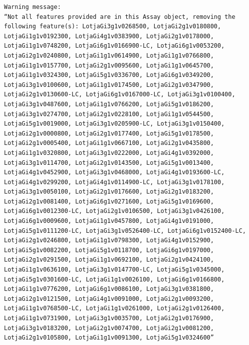 \documentclass[
  letterpaper,
  DIV=11,
  numbers=noendperiod]{scrartcl}
\begin{document}
\begin{verbatim}
Warning message:
“Not all features provided are in this Assay object, removing the following feature(s): LotjaGi3g1v0268500, LotjaGi2g1v0180800, LotjaGi1g1v0192300, LotjaGi4g1v0383900, LotjaGi2g1v0178000, LotjaGi1g1v0748200, LotjaGi6g1v0166900-LC, LotjaGi6g1v0053200, LotjaGi2g1v0240800, LotjaGi1g1v0614900, LotjaGi1g1v0766800, LotjaGi1g1v0157700, LotjaGi2g1v0095600, LotjaGi1g1v0645700, LotjaGi1g1v0324300, LotjaGi5g1v0336700, LotjaGi6g1v0349200, LotjaGi3g1v0100600, LotjaGi1g1v0174500, LotjaGi2g1v0347900, LotjaGi2g1v0130600-LC, LotjaGi6g1v0167000-LC, LotjaGi3g1v0100400, LotjaGi3g1v0487600, LotjaGi1g1v0766200, LotjaGi5g1v0186200, LotjaGi3g1v0274700, LotjaGi2g1v0228100, LotjaGi1g1v0544500, LotjaGi5g1v0019000, LotjaGi3g1v0205900-LC, LotjaGi3g1v0150400, LotjaGi2g1v0000800, LotjaGi2g1v0177400, LotjaGi5g1v0178500, LotjaGi2g1v0005400, LotjaGi1g1v0667100, LotjaGi2g1v0435800, LotjaGi1g1v0320800, LotjaGi3g1v0222000, LotjaGi4g1v0392000, LotjaGi3g1v0114700, LotjaGi2g1v0143500, LotjaGi5g1v0013400, LotjaGi4g1v0452900, LotjaGi3g1v0468000, LotjaGi4g1v0193600-LC, LotjaGi4g1v0299200, LotjaGi4g1v0114900-LC, LotjaGi3g1v0178100, LotjaGi3g1v0050100, LotjaGi2g1v0176600, LotjaGi2g1v0183200, LotjaGi2g1v0081400, LotjaGi6g1v0271600, LotjaGi5g1v0169600, LotjaGi6g1v0012300-LC, LotjaGi2g1v0106500, LotjaGi3g1v0426100, LotjaGi6g1v0009600, LotjaGi1g1v0457800, LotjaGi4g1v0191000, LotjaGi5g1v0111200-LC, LotjaGi3g1v0526400-LC, LotjaGi6g1v0152400-LC, LotjaGi2g1v0246800, LotjaGi1g1v0798300, LotjaGi4g1v0152900, LotjaGi5g1v0082200, LotjaGi5g1v0118700, LotjaGi6g1v0197000, LotjaGi2g1v0291500, LotjaGi1g1v0692100, LotjaGi2g1v0424100, LotjaGi1g1v0636100, LotjaGi3g1v0147700-LC, LotjaGi5g1v0345000, LotjaGi5g1v0301600-LC, LotjaGi1g1v0026100, LotjaGi6g1v0166800, LotjaGi1g1v0776200, LotjaGi6g1v0086100, LotjaGi3g1v0381800, LotjaGi2g1v0121500, LotjaGi4g1v0091000, LotjaGi2g1v0093200, LotjaGi1g1v0768500-LC, LotjaGi1g1v0261000, LotjaGi2g1v0126400, LotjaGi1g1v0731900, LotjaGi3g1v0035700, LotjaGi2g1v0176900, LotjaGi3g1v0183200, LotjaGi2g1v0074700, LotjaGi2g1v0081200, LotjaGi2g1v0105800, LotjaGi1g1v0091300, LotjaGi5g1v0324600”
\end{verbatim}
\end{document}

